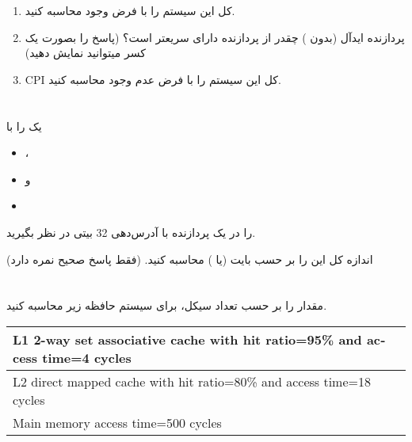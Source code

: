 \documentclass[11pt, dvipsnames, svgnames, x11names]{article}
\begin{document}
\begin{enumerate}
\item 
{} 
کل این سیستم را با فرض وجود  محاسبه کنید.

\item 
پردازنده ایدآل (بدون ) چقدر از پردازنده دارای  سریعتر است؟ (پاسخ را بصورت یک کسر میتوانید نمایش دهید)

\item 
CPI 
کل این سیستم را با فرض عدم وجود  محاسبه کنید.
\end{enumerate}

\section{}
یک
را با
\begin{itemize}
\item {}،
\item {} و
\item {}
\end{itemize}
را در یک پردازنده با آدرس‌دهی 32 بیتی در نظر بگیرید.

اندازه کل این  را بر حسب بایت (یا ) محاسبه کنید. (فقط پاسخ صحیح نمره دارد) 

\section{}
مقدار  را بر حسب تعداد سیکل، برای سیستم حافظه زیر محاسبه کنید. 
\begin{latin}
\begin{table}[H]
\begin{adjustbox}{width=\textwidth}
\begin{tabular}{|l|}
\hline
L1 2-way set associative cache with
hit ratio=95\% and access time=4 cycles\\
\hline
L2 direct mapped cache with
hit ratio=80\% and  access time=18 cycles \\
\hline
Main memory access time=500 cycles \\
\hline
\end{tabular}
\end{adjustbox}
\end{table}
\end{latin}
\end{document}
